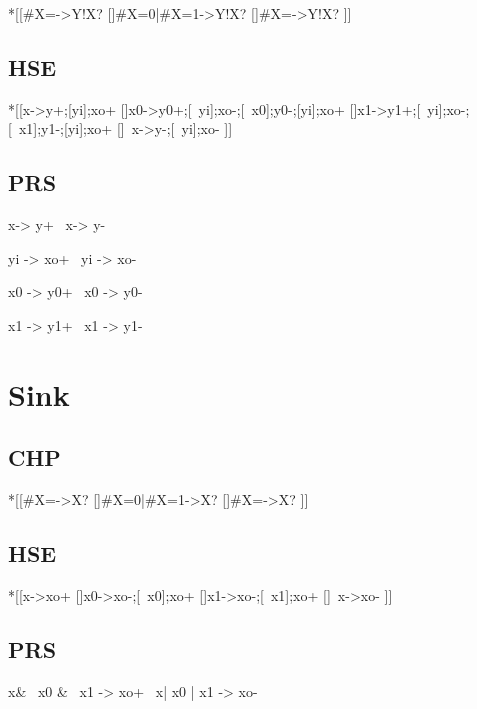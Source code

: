 \documentclass{article}
\begin{document}
\begin{csp}
*[[#{X=\phi}->Y!X?
  []#{X=0}|#{X=1}->Y!X?
  []#{X=\neg\phi}->Y!X?
 ]]
\end{csp}

\subsection*{HSE}

\begin{hse}
*[[x\phi->y\phi+;[yi];xo+
  []x0->y0+;[~yi];xo-;[~x0];y0-;[yi];xo+
  []x1->y1+;[~yi];xo-;[~x1];y1-;[yi];xo+
  []~x\phi->y\phi-;[~yi];xo-
 ]]
\end{hse}

\subsection*{PRS}

\begin{prs2}
x\phi -> y\phi+
~x\phi -> y\phi-
\end{prs2}

\begin{prs2}
yi -> xo+
~yi -> xo-
\end{prs2}

\begin{prs2}
x0 -> y0+
~x0 -> y0-

x1 -> y1+
~x1 -> y1-
\end{prs2}

\section{Sink}

\subsection*{CHP}

\begin{csp}
*[[#{X=\phi}->X?
  []#{X=0}|#{X=1}->X?
  []#{X=\neg\phi}->X?
 ]]
\end{csp}

\subsection*{HSE}

\begin{hse}
*[[x\phi->xo+
  []x0->xo-;[~x0];xo+
  []x1->xo-;[~x1];xo+
  []~x\phi->xo-
 ]]
\end{hse}

\subsection*{PRS}

\begin{prs2}
x\phi & ~x0 & ~x1 -> xo+
~x\phi | x0 | x1 -> xo-
\end{prs2}

\end{document}
